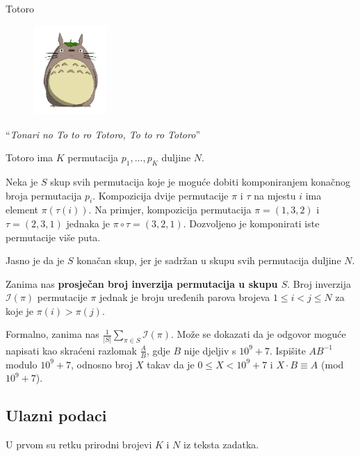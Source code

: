 \begin{statement}[
  problempoints=100,
  timelimit=1 sekunda,
  memorylimit=512 MiB,
]{Totoro}

\setlength\intextsep{-0.1cm}
\begin{figure}
\centering
\includegraphics[width=0.25\textwidth]{img/totoro.png}
\end{figure}

``\textit{Tonari no To to ro Totoro, To to ro Totoro}'' 

Totoro ima $K$ permutacija $p_1, \ldots, p_K$ duljine $N$.

Neka je $S$ skup svih permutacija koje je moguće
dobiti komponiranjem konačnog broja permutacija $p_i$. 
Kompozicija dvije permutacije $\pi$ i $\tau$ 
na mjestu $i$ ima element $\pi(\tau(i))$. Na primjer, 
kompozicija permutacija $\pi = (1, 3, 2)$
i $\tau = (2, 3, 1)$ jednaka je $\pi \circ \tau = (3, 2, 1)$. 
Dozvoljeno je komponirati iste permutacije više puta.

Jasno je da je $S$ konačan skup, jer je sadržan u skupu svih
permutacija duljine $N$.

Zanima nas \textbf{prosječan broj inverzija permutacija u skupu $S$}.
Broj inverzija $\mathcal{I}(\pi)$ permutacije $\pi$ 
jednak je broju uređenih parova
brojeva $1 \le i < j \le N$ za koje je $\pi(i) > \pi(j)$.

Formalno, zanima nas $\frac{1}{|S|} \sum_{\pi \in S} \mathcal{I} (\pi)$.
Može se dokazati da je odgovor moguće napisati
kao skraćeni razlomak $\frac{A}{B}$, gdje $B$ nije djeljiv s $10^9 + 7$. 
Ispišite $AB^{-1}$ modulo $10^9 + 7$, odnosno broj $X$ takav da je
  $0 \leq X < 10^9 + 7$ i $X \cdot B \equiv A$ (mod $10^9 + 7$).

\subsection*{Ulazni podaci}
U prvom su retku prirodni brojevi $K$ i $N$ iz teksta zadatka.


\end{statement}
